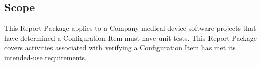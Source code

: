 \subsection{Scope}
This Report Package applies to a Company medical device software projects that
have determined a Configuration Item must have unit tests.  This Report Package
covers activities associated with verifying a Configuration Item has met its
intended-use requirements.
